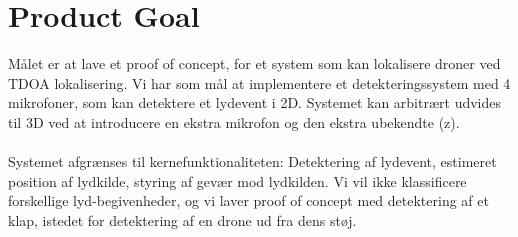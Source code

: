 \documentclass[10pt,addpoints,answers]{exam}
\begin{document}
\section*{Product Goal}
Målet er at lave et proof of concept, for et system som kan lokalisere droner ved TDOA lokalisering. Vi har som mål at implementere et detekteringssystem med 4 mikrofoner, som kan detektere et lydevent i 2D. Systemet kan arbitrært udvides til 3D ved at introducere en ekstra mikrofon og den ekstra ubekendte (z).
\\
\\
Systemet afgrænses til kernefunktionaliteten: Detektering af lydevent, estimeret position af lydkilde, styring af gevær mod lydkilden. Vi vil ikke klassificere forskellige lyd-begivenheder, og vi laver proof of concept med detektering af et klap, istedet for detektering af en drone ud fra dens støj.
\end{document}
